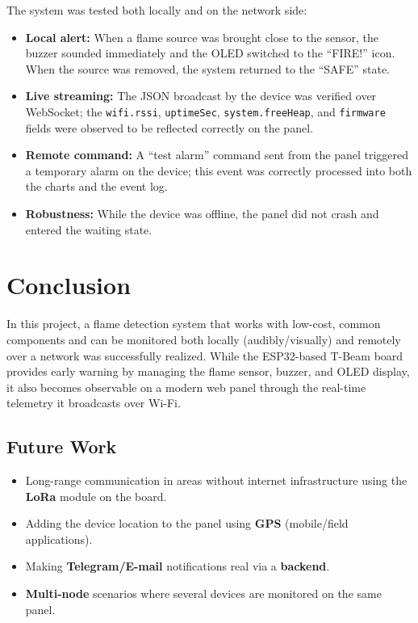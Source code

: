 \documentclass[11pt,a4paper]{article}
\begin{document}
The system was tested both locally and on the network side:
\begin{itemize}[leftmargin=1.4em]
  \item \textbf{Local alert:} When a flame source was brought close to the sensor, the
        buzzer sounded immediately and the OLED switched to the ``FIRE!'' icon. When the
        source was removed, the system returned to the ``SAFE'' state.
  \item \textbf{Live streaming:} The JSON broadcast by the device was verified over
        WebSocket; the \texttt{wifi.rssi}, \texttt{uptimeSec}, \texttt{system.freeHeap},
        and \texttt{firmware} fields were observed to be reflected correctly on the panel.
  \item \textbf{Remote command:} A ``test alarm'' command sent from the panel triggered a
        temporary alarm on the device; this event was correctly processed into both the
        charts and the event log.
  \item \textbf{Robustness:} While the device was offline, the panel did not crash and
        entered the waiting state.
\end{itemize}

\section{Conclusion}

In this project, a flame detection system that works with low-cost, common components and
can be monitored both locally (audibly/visually) and remotely over a network was
successfully realized. While the ESP32-based T-Beam board provides early warning by
managing the flame sensor, buzzer, and OLED display, it also becomes observable on a modern
web panel through the real-time telemetry it broadcasts over Wi-Fi.

\subsection{Future Work}
\begin{itemize}[leftmargin=1.4em]
  \item Long-range communication in areas without internet infrastructure using the
        \textbf{LoRa} module on the board.
  \item Adding the device location to the panel using \textbf{GPS} (mobile/field
        applications).
  \item Making \textbf{Telegram/E-mail} notifications real via a \textbf{backend}.
  \item \textbf{Multi-node} scenarios where several devices are monitored on the same panel.
\end{itemize}
\end{document}

